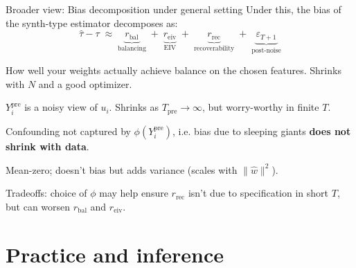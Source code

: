 \documentclass[xcolor=dvipsnames]{beamer}
\newcommand\smallunskip{\vspace{-.25\baselineskip}}
\renewcommand{\epsilon}{\varepsilon}
\newcommand{\ypre}{Y^{\text{pre}}_i}      %
\newcommand{\reiv}{r_{\text{eiv}}}        %
\newcommand{\rrec}{r_{\text{rec}}}        %
\begin{document}
\begin{frame}{Broader view: Bias decomposition under general setting}
 Under this, the bias of the synth-type estimator decomposes as:
\[
\widehat\tau - \tau \;\approx\; \underbrace{r_{\text{bal}}}_{\text{balancing}} \;+\; \underbrace{\reiv}_{\text{EIV}} \;+\; \underbrace{\rrec}_{\text{recoverability}} \;+\; \underbrace{\epsilon_{T+1}}_{\text{post-noise}}
\]
\small
{}
\begin{description}\smallunskip
\item[$r_{\text{bal}}$] How well your weights actually achieve balance on the chosen features. Shrinks with $N$ and a good optimizer.
\item[$\reiv$] $\ypre$ is a noisy view of $u_i$. Shrinks as $T_{\text{pre}} \to \infty$, but worry-worthy in finite $T$.
\item[$\rrec$] Confounding not captured by $\phi(\ypre)$, i.e. bias due to sleeping giants \textbf{does not shrink with data}.
\item[$\epsilon_{T+1}$] Mean-zero; doesn't bias but adds variance (scales with $\|\hat w\|^2$).
\end{description}
\small
{} Tradeoffs:  choice of $\phi$ may help ensure $\rrec$ isn't due to specification in short $T$, but can worsen $r_{\text{bal}}$ and $\reiv$. 
\end{frame}

\section{Practice and inference}
\end{document}
